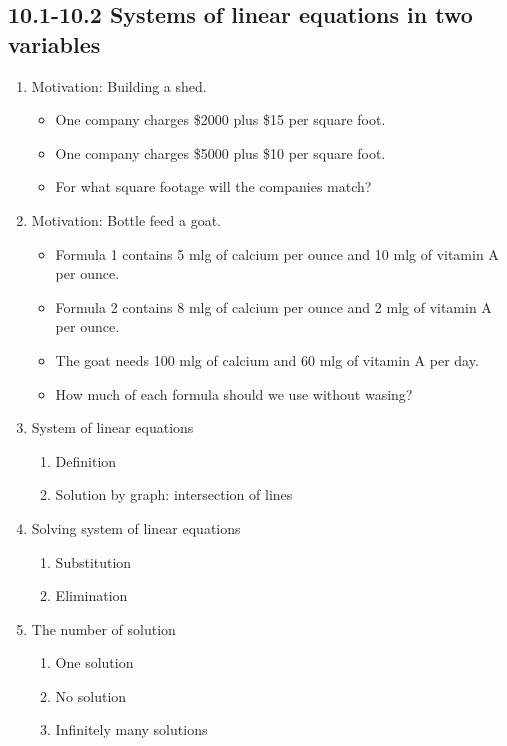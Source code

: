 \documentclass{article}
\begin{document}
\subsection{10.1-10.2 Systems of linear equations in two variables}


\begin{enumerate}
\item Motivation: Building a shed. 
\begin{itemize}
\item One company charges \$2000 plus \$15 per square foot. 
\item One company charges \$5000 plus \$10 per square foot. 
\item For what square footage will the companies match?	
\end{itemize}

\item Motivation: Bottle feed a goat.
\begin{itemize}
\item Formula 1 contains 5 mlg of calcium per ounce and 10 mlg of vitamin A per ounce.
\item Formula 2 contains 8 mlg of calcium per ounce and 2 mlg of vitamin A per ounce.
\item The goat needs 100 mlg of calcium and 60 mlg of vitamin A per day.
\item How much of each formula should we use without wasing?
\end{itemize}

\item System of linear equations
\begin{enumerate}
\item Definition
\item Solution by graph: intersection of lines
\end{enumerate}
\item Solving system of linear equations
\begin{enumerate}
\item Substitution
\item Elimination
\end{enumerate}
\item The number of solution
\begin{enumerate}
\item One solution
\item No solution
\item Infinitely many solutions
\end{enumerate}
\end{enumerate}
\end{document}
